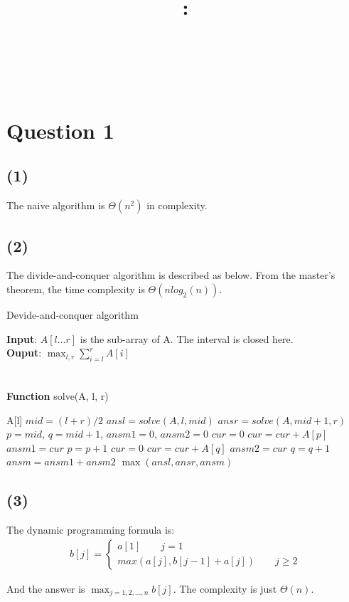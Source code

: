 \documentclass{article}
\title{
    \vspace{2in}
    \textmd{\textbf{\courseName}:\homeworkTitle}\\
    \vspace{0.1in}
    \large{\studentId}\\
    \large{\studentName}\\
    \vspace{3in}
}
\newcommand{\question}[1]{\section*{Question #1}}
\renewcommand{\part}[1]{\subsection*{(#1)}}
\begin{document}
\maketitle
\date{}
\pagebreak

\question{1}
\part{1}
The naive algorithm is $\Theta(n^2)$ in complexity.

\part{2}
The divide-and-conquer algorithm is described as below. From the master's theorem, the time complexity is $\Theta(nlog_2(n))$.

\begin{algorithm}
  \caption{Devide-and-conquer algorithm}
  \textbf{Input}: $A[l ... r]$ is the sub-array of A. The interval is closed here. \\
  \textbf{Ouput}: $\displaystyle\max_{l, r} \displaystyle\sum_{i = l}^r A[i]$ \\
  \\ \\
  \textbf{Function} solve(A, l, r) \\
  \begin{algorithmic}[1]
      \Return A[l]
    \EndIf
    \State $mid = (l + r) / 2$
    \State $ansl = solve(A, l, mid)$
    \State $ansr = solve(A, mid + 1, r)$
    \State $p = mid$, $q = mid + 1$, $ansm1 = 0$, $ansm2 = 0$
    \State $cur = 0$
        \State $cur = cur + A[p]$
          \State $ansm1 = cur$
        \EndIf
        \State $p = p + 1$
    \EndWhile
    \State $cur = 0$
      \State $cur = cur + A[q]$
        \State $ansm2 = cur$
      \EndIf
      \State $q = q + 1$
    \EndWhile
    \State $ansm = ansm1 + ansm2$
    \State \Return $\max(ansl, ansr, ansm)$
  \end{algorithmic}
\end{algorithm}

\part{3}
The dynamic programming formula is:
\begin{align}
  b[j] = \begin{cases} a[1] \qquad j = 1 \\
    max(a[j], b[j - 1] + a[j]) \qquad j \geq 2
  \end{cases}
\end{align} \par
  And the answer is $\displaystyle\max_{j = 1, 2, ..., n} b[j]$. The complexity is just $\Theta(n)$.
\end{document}
